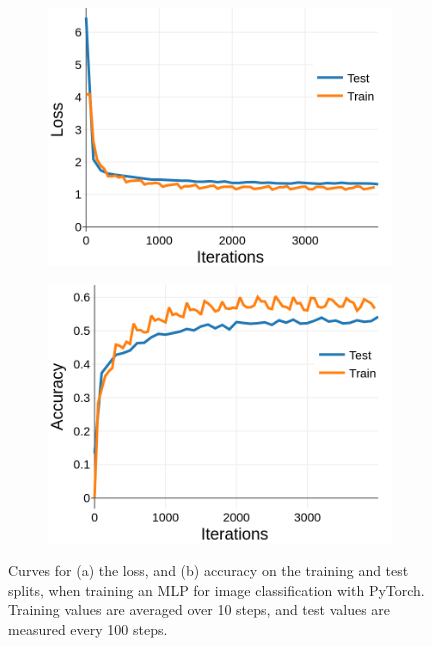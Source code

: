 \documentclass{article}
\begin{document}
\begin{figure}[t]
\begin{subfigure}{0.49\textwidth}
\centering
\includegraphics[scale=0.22]{img/torchmlp-loss}
\caption{}
\end{subfigure}
\begin{subfigure}{0.49\textwidth}
\centering
\includegraphics[scale=0.22]{img/torchmlp-acc}
\caption{}
\end{subfigure}
 \caption{Curves for (a) the loss, and (b) accuracy on the training and test splits, when training an MLP for image classification with PyTorch. Training values are averaged over 10 steps, and test values are measured every 100 steps.}
\label{fig:torch_curves}
\end{figure}
\end{document}
